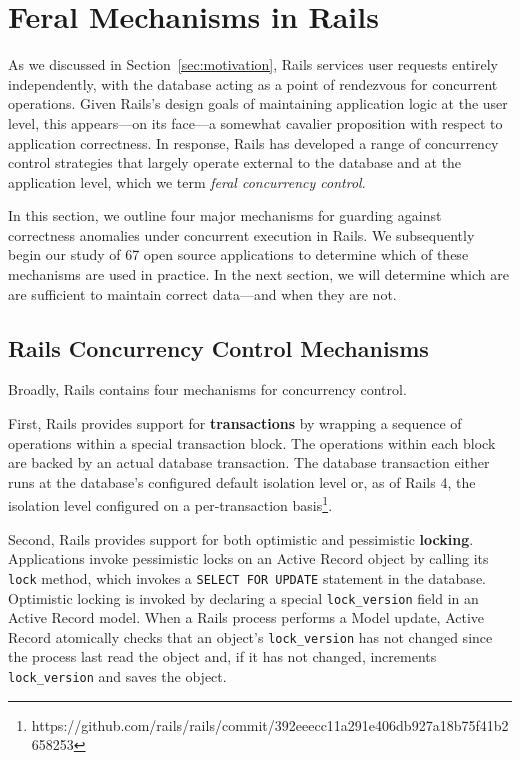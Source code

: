 
\section{Feral Mechanisms in Rails}
\label{sec:rails-cc}

As we discussed in Section~\ref{sec:motivation}, Rails services user
requests entirely independently, with the database acting as a point
of rendezvous for concurrent operations. Given Rails's design goals of
maintaining application logic at the user level, this appears---on its
face---a somewhat cavalier proposition with respect to application
correctness. In response, Rails has developed a range of
concurrency control strategies that largely operate external to the
database and at the application level, which we term \textit{feral
  concurrency control}.

In this section, we outline four major mechanisms for guarding against
correctness anomalies under concurrent execution in Rails. We
subsequently begin our study of 67 open source applications to
determine which of these mechanisms are used in practice. In the next
section, we will determine which are are sufficient to maintain
correct data---and when they are not.

\subsection{Rails Concurrency Control Mechanisms}

Broadly, Rails contains four mechanisms for concurrency control.

First, Rails provides support for \textbf{transactions} by wrapping a
sequence of operations within a special transaction block. The
operations within each block are backed by an actual database
transaction. The database transaction either runs at the database's
configured default isolation level or, as of Rails 4, the isolation
level configured on a per-transaction
basis\footnote{https://github.com/rails/rails/commit/392eeecc11a291e406db927a18b75f41b2658253}.

Second, Rails provides support for both optimistic and pessimistic
\textbf{locking}. Applications invoke pessimistic locks on an Active
Record object by calling its \texttt{lock} method, which invokes a
\texttt{SELECT FOR UPDATE} statement in the database. Optimistic
locking is invoked by declaring a special \texttt{lock\_version} field
in an Active Record model. When a Rails process performs a Model
update, Active Record atomically checks that an object's
\texttt{lock\_version} has not changed since the process last read the
object and, if it has not changed, increments \texttt{lock\_version}
and saves the object.

